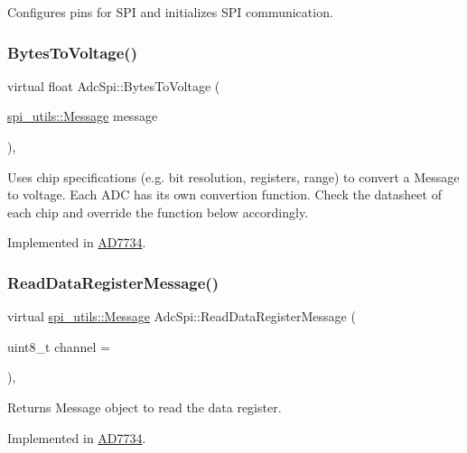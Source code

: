 Configures pins for S\+PI and initializes S\+PI communication. \mbox{\label{classAdcSpi_a778d7c86b37cebe4444ec5284f2ea9b7}} 
\subsubsection{\texorpdfstring{Bytes\+To\+Voltage()}{BytesToVoltage()}}
{\footnotesize\ttfamily virtual float Adc\+Spi\+::\+Bytes\+To\+Voltage (\begin{DoxyParamCaption}\item[{\mbox{\hyperlink{structspi__utils_1_1Message}{spi\+\_\+utils\+::\+Message}}}]{message }\end{DoxyParamCaption})\hspace{0.3cm}{\ttfamily [protected]}, {}}

Uses chip specifications (e.\+g. bit resolution, registers, range) to convert a Message to voltage. Each A\+DC has its own convertion function. Check the datasheet of each chip and override the function below accordingly. 

Implemented in \mbox{\hyperlink{classAD7734_a76b600d52392dbfe2d053e166af41018}{A\+D7734}}.

\mbox{\label{classAdcSpi_a3578f18e1976d9e2b075a3fbdc003517}} 
\subsubsection{\texorpdfstring{Read\+Data\+Register\+Message()}{ReadDataRegisterMessage()}}
{\footnotesize\ttfamily virtual \mbox{\hyperlink{structspi__utils_1_1Message}{spi\+\_\+utils\+::\+Message}} Adc\+Spi\+::\+Read\+Data\+Register\+Message (\begin{DoxyParamCaption}\item[{uint8\+\_\+t}]{channel = {} }\end{DoxyParamCaption})\hspace{0.3cm}{\ttfamily [protected]}, {}}

Returns Message object to read the data register. 

Implemented in \mbox{\hyperlink{classAD7734_a6fa5e7c2bd8cde50dccb328d36f12516}{A\+D7734}}.

